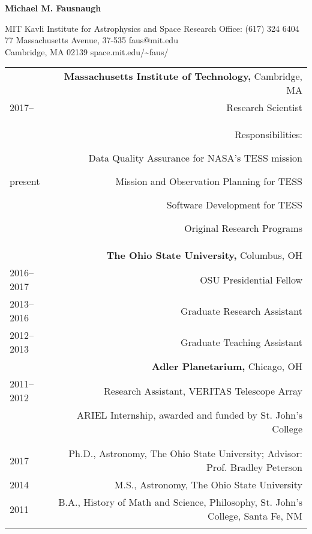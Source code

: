 \documentclass[letterpaper,12pt]{article}
\begin{document}
\begin{center}
\huge\bfseries{Michael M. Fausnaugh}
\end{center}

\noindent MIT Kavli Institute for Astrophysics and Space Research \hfill Office: (617) 324 6404 \\
77 Massachusetts Avenue, 37-535  \hfill faus@mit.edu\\
Cambridge, MA 02139 \hfill space.mit.edu/\textasciitilde faus/

%

\begin{longtable}{LR}

  \underline{} 
  &\textbf{Massachusetts Institute of Technology,} Cambridge, MA\\
  2017-- & Research Scientist \\
  present &Responsibilities: \begin{compactitem}
   \item Data Quality Assurance for NASA's TESS mission
   \item Mission and Observation Planning for TESS
   \item Software Development for TESS
   \item Original Research Programs
   \end{compactitem}	
   \\

  &\textbf{The Ohio State University,} Columbus, OH\\
  2016--2017 & OSU Presidential Fellow\\
  2013--2016 & Graduate Research Assistant \\
  2012--2013 & Graduate Teaching Assistant \\
  &\textbf{Adler Planetarium,} Chicago, OH\\
  2011--2012 & Research Assistant, VERITAS Telescope Array\\
  &  ARIEL Internship, awarded and funded by St. John's College \\
  \\
  
\underline{} &     \\
2017   &    Ph.D., Astronomy, The Ohio State University;  Advisor:  Prof. Bradley Peterson\\
2014 &    M.S.,  Astronomy, The Ohio State University\\
2011&B.A., History of Math and Science, Philosophy, St. John's College, Santa Fe, NM\\
\\


\end{longtable}
\end{document}
